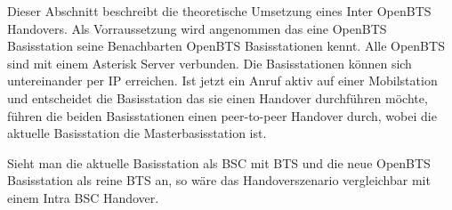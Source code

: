 \label{sec:interbts}

Dieser Abschnitt beschreibt die theoretische Umsetzung eines Inter OpenBTS Hand\-overs. Als Vorraussetzung wird angenommen das eine OpenBTS Basisstation seine Benachbarten OpenBTS Basisstationen kennt. Alle OpenBTS sind mit einem Asterisk Server verbunden. Die Basisstationen können sich untereinander per IP erreichen. Ist jetzt ein Anruf aktiv auf einer Mobilstation und entscheidet die Basisstation das sie einen Handover durchführen möchte, führen die beiden Basisstationen einen peer-to-peer Handover durch, wobei die aktuelle Basisstation die Masterbasisstation ist.

Sieht man die aktuelle Basisstation als BSC mit BTS und die neue OpenBTS Basisstation als reine BTS an, so wäre das Handoverszenario vergleichbar mit einem Intra BSC Handover.
